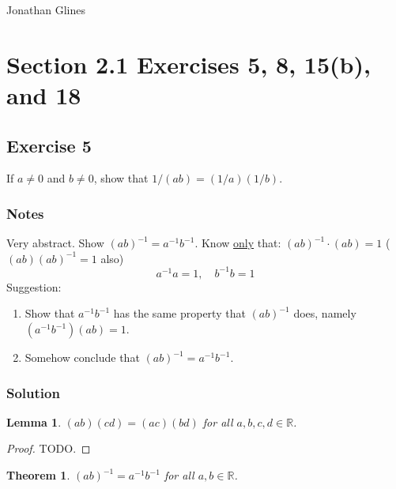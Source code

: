 \documentclass[12pt]{article}
\newtheorem*{thm}{Theorem}
\newtheorem{lem}{Lemma}
\begin{document}
\begin{flushright}
\Large{Jonathan Glines}
\end{flushright}
\section*{Section 2.1 Exercises 5, 8, 15(b), and 18}
\subsection*{Exercise 5}
If $a \ne 0$ and $b \ne 0$, show that $1/\left(ab\right) = \left(1/a\right)\left(1/b\right)$.

\subsubsection*{Notes}
Very abstract. Show $\left(ab\right)^{-1} = a^{-1}b^{-1}$. Know \underline{only} that: $\left(ab\right)^{-1}\cdot\left(ab\right) = 1$ ($(ab)(ab)^{-1} = 1$ also)
\[
a^{-1} a = 1,\quad
b^{-1} b = 1
\]
Suggestion:
\begin{enumerate}
\item Show that $a^{-1}b^{-1}$ has the same property that $(ab)^{-1}$ does, namely $(a^{-1}b^{-1})(ab) = 1$.
\item Somehow conclude that $(ab)^{-1} = a^{-1}b^{-1}$.
\end{enumerate}

\subsubsection*{Solution}
\begin{lem}
$\left(ab\right)\left(cd\right) = \left(ac\right)\left(bd\right)$ for all $a, b, c, d \in \mathbb{R}$.
\end{lem}

\begin{proof}
TODO.
\end{proof}

\begin{thm}
$\left(ab\right)^{-1} = a^{-1}b^{-1}$ for all $a, b \in \mathbb{R}$.
\end{thm}
\end{document}
